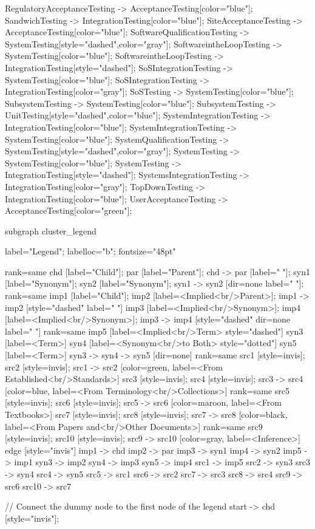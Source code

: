 \documentclass{article}
\begin{document}
{RegulatoryAcceptanceTesting -> AcceptanceTesting[color="blue"];
SandwichTesting -> IntegrationTesting[color="blue"];
SiteAcceptanceTesting -> AcceptanceTesting[color="blue"];
SoftwareQualificationTesting -> SystemTesting[style="dashed",color="gray"];
SoftwareintheLoopTesting -> SystemTesting[color="blue"];
SoftwareintheLoopTesting -> IntegrationTesting[style="dashed"];
SoSIntegrationTesting -> SystemTesting[color="blue"];
SoSIntegrationTesting -> IntegrationTesting[color="gray"];
SoSTesting -> SystemTesting[color="blue"];
SubsystemTesting -> SystemTesting[color="blue"];
SubsystemTesting -> UnitTesting[style="dashed",color="blue"];
SystemIntegrationTesting -> IntegrationTesting[color="blue"];
SystemIntegrationTesting -> SystemTesting[color="blue"];
SystemQualificationTesting -> SystemTesting[style="dashed",color="gray"];
SystemTesting -> SystemTesting[color="blue"];
SystemTesting -> IntegrationTesting[style="dashed"];
SystemsIntegrationTesting -> IntegrationTesting[color="gray"];
TopDownTesting -> IntegrationTesting[color="blue"];
UserAcceptanceTesting -> AcceptanceTesting[color="green"];

subgraph cluster_legend {

    label="Legend";
    labelloc="b";
    fontsize="48pt"

    {
        rank=same
        chd [label="Child"];
        par [label="Parent"];
        chd -> par [label="                "];
        syn1 [label="Synonym"];
        syn2 [label="Synonym"];
        syn1 -> syn2 [dir=none label="                "];
    }
    {
        rank=same
        imp1 [label="Child"];
        imp2 [label=<Implied<br/>Parent>];
        imp1 -> imp2 [style="dashed" label="                "]
        imp3 [label=<Implied<br/>Synonym>];
        imp4 [label=<Implied<br/>Synonym>];
        imp3 -> imp4 [style="dashed" dir=none label="                "]
    }
    {
        rank=same
        imp5 [label=<Implied<br/>Term> style="dashed"]
        syn3 [label=<Term>]
        syn4 [label=<Synonym<br/>to Both> style="dotted"]
        syn5 [label=<Term>]
        syn3 -> syn4 -> syn5 [dir=none]
    }
{
rank=same
src1 [style=invis];
src2 [style=invis];
src1 -> src2 [color=green, label=<From Established<br/>Standards>]
src3 [style=invis];
src4 [style=invis];
src3 -> src4 [color=blue, label=<From Terminology<br/>Collections>]
}
{
rank=same
src5 [style=invis];
src6 [style=invis];
src5 -> src6 [color=maroon, label=<From Textbooks>]
src7 [style=invis];
src8 [style=invis];
src7 -> src8 [color=black, label=<From Papers and<br/>Other Documents>]
}
{
rank=same
src9 [style=invis];
src10 [style=invis];
src9 -> src10 [color=gray, label=<Inference>]
}
edge [style="invis"]
imp1 -> chd
imp2 -> par
imp3 -> syn1
imp4 -> syn2
imp5 -> imp1
syn3 -> imp2
syn4 -> imp3
syn5 -> imp4
src1 -> imp5
src2 -> syn3
src3 -> syn4
src4 -> syn5
src5 -> src1
src6 -> src2
src7 -> src3
src8 -> src4
src9 -> src6
src10 -> src7
}

// Connect the dummy node to the first node of the legend
start -> chd [style="invis"];
}
\end{document}
